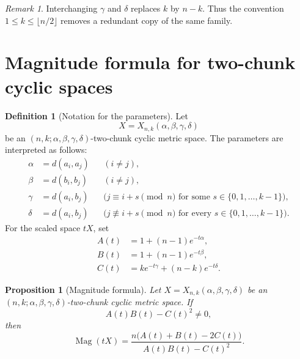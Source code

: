 \documentclass[11pt]{amsart}
\numberwithin{equation}{section}
\newtheorem{proposition}[theorem]{Proposition}
\theoremstyle{definition}
\newtheorem{definition}[theorem]{Definition}
\theoremstyle{remark}
\newtheorem{remark}[theorem]{Remark}
\DeclareMathOperator{\Mag}{Mag}
\begin{document}
\begin{remark}\label{rem:k-symmetry}
Interchanging \(\gamma\) and \(\delta\) replaces \(k\) by \(n-k\).  Thus the convention \(1\leq k\leq \lfloor n/2\rfloor\) removes a redundant copy of the same family.
\end{remark}

\section{Magnitude formula for two-chunk cyclic spaces}

\begin{definition}[Notation for the parameters]\label{def:alpha-beta-gamma-delta}
Let
\begin{equation}\label{eq:X-two-chunk-notation}
X=X_{n,k}(\alpha,\beta,\gamma,\delta)
\end{equation}
be an \((n,k;\alpha,\beta,\gamma,\delta)\)-two-chunk cyclic metric space.  The parameters are interpreted as follows:
\begin{align}
\alpha&=d(a_i,a_j) &&(i\neq j),
\label{eq:alpha-notation}\\
\beta&=d(b_i,b_j) &&(i\neq j),
\label{eq:beta-notation}\\
\gamma&=d(a_i,b_j) &&\bigl(j\equiv i+s \pmod{n}
\text{ for some }s\in\{0,1,\ldots,k-1\}\bigr),
\label{eq:gamma-notation}\\
\delta&=d(a_i,b_j) &&\bigl(j\not\equiv i+s \pmod{n}
\text{ for every }s\in\{0,1,\ldots,k-1\}\bigr).
\label{eq:delta-notation}
\end{align}
For the scaled space \(tX\), set
\begin{align}
A(t)&=1+(n-1)e^{-t\alpha},
\label{eq:A-t-definition}\\
B(t)&=1+(n-1)e^{-t\beta},
\label{eq:B-t-definition}\\
C(t)&=k e^{-t\gamma}+(n-k)e^{-t\delta}.
\label{eq:C-t-definition}
\end{align}
\end{definition}

\begin{proposition}[Magnitude formula]\label{prop:magnitude-formula}
Let \(X=X_{n,k}(\alpha,\beta,\gamma,\delta)\) be an \((n,k;\alpha,\beta,\gamma,\delta)\)-two-chunk cyclic metric space.  If
\begin{equation}\label{eq:nonzero-denominator-finite-t}
A(t)B(t)-C(t)^2\neq 0,
\end{equation}
then
\begin{equation}\label{eq:magnitude-formula}
\Mag(tX)=\frac{n\bigl(A(t)+B(t)-2C(t)\bigr)}{A(t)B(t)-C(t)^2}.
\end{equation}
\end{proposition}
\end{document}
